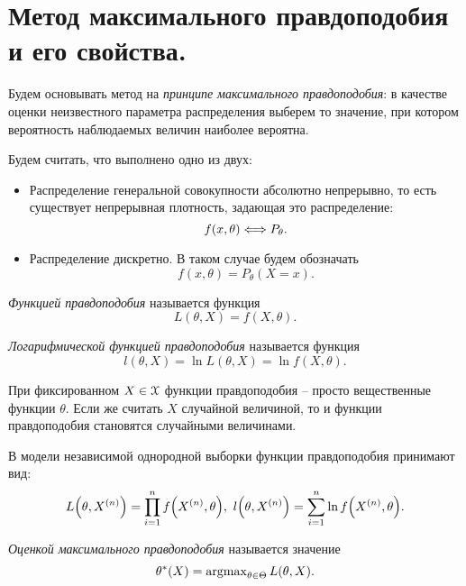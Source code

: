 \section{Метод максимального правдоподобия и его свойства.}

Будем основывать метод на \textit{принципе максимального правдоподобия}:
в качестве оценки неизвестного параметра распределения выберем то значение,
при котором вероятность наблюдаемых величин наиболее вероятна.

Будем считать, что выполнено одно из двух:
\begin{itemize}
    \item Распределение генеральной совокупности абсолютно непрерывно, то
        есть существует непрерывная плотность, задающая это распределение:
        \[
            f(x, \theta) \Longleftrightarrow P_\theta
        .\]
    \item Распределение дискретно. В таком случае будем обозначать
        \[
            f(x, \theta) = P_\theta(X = x)
        .\]
\end{itemize}

\begin{definition}
    \textit{Функцией правдоподобия} называется функция
    \[
        L(\theta, X) = f(X, \theta)
    .\]
\end{definition}

\begin{definition}
    \textit{Логарифмической функцией правдоподобия} называется функция
    \[
        l(\theta, X) = \ln{L(\theta, X)} = \ln{f(X, \theta)}
    .\]
\end{definition}

\begin{remark}
    При фиксированном $X \in \mathcal{X}$ функции правдоподобия -- просто вещественные
    функции $\theta$. Если же считать $X$ случайной величиной, то
    и функции правдоподобия становятся случайными величинами. 
\end{remark}

\begin{remark}
    В модели независимой однородной выборки функции правдоподобия принимают вид:
    \[
        L\parens*{\theta, X^{(n)}} = \prod_{i = 1}^n{f\parens*{X^{(n)}, \theta}},~
        l\parens*{\theta, X^{(n)}} = \sum_{i = 1}^n{\ln{f\parens*{X^{(n)}, \theta}}}
    .\]
\end{remark}

\begin{definition}
    \textit{Оценкой максимального правдоподобия} называется значение
    \[
        \theta^*(X) = \operatorname{argmax}_{\theta \in \Theta}{L(\theta, X)}
    .\]
\end{definition}

